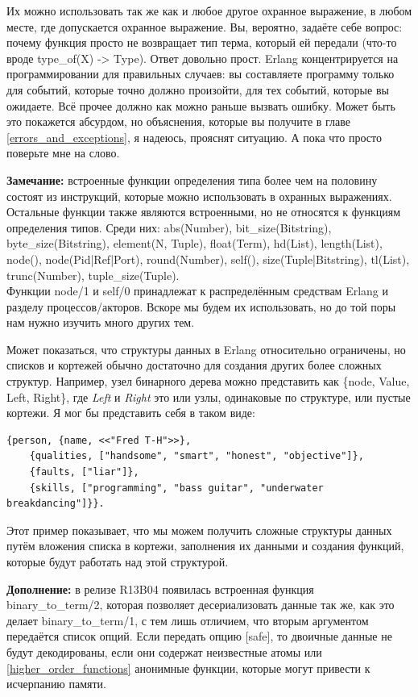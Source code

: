 \documentclass[a4paper,12pt]{report}
\newcommand{\ops}{\colorbox{lgreen}}
\begin{document}
Их можно использовать так же как и любое другое охранное выражение, в любом месте, где допускается охранное выражение. Вы, вероятно, задаёте себе вопрос: почему функция просто не возвращает тип терма, который ей передали (что\--то вроде \ops{type\_of(X) -> Type}). Ответ довольно прост. Erlang концентрируется на программировании для правильных случаев: вы составляете программу только для событий, которые точно должно произойти, для тех событий, которые вы ожидаете. Всё прочее должно как можно раньше вызвать ошибку. Может быть это покажется абсурдом, но объяснения, которые вы получите в главе \ref{errors_and_exceptions}, я надеюсь, прояснят ситуацию. А пока что просто поверьте мне на слово.\\
\colorbox{lgray}
{
    \begin{minipage}{\linewidth}
\textbf{Замечание:} встроенные функции определения типа более чем на половину состоят из инструкций, которые можно использовать в охранных выражениях. Остальные функции также являются встроенными, но не относятся к функциям определения типов. Среди них: \ops{abs(Number), bit\_size(Bitstring), byte\_size(Bitstring),}
\ops{element(N, Tuple), float(Term), hd(List), length(List),}
\ops{node(), node(Pid|Ref|Port), round(Number), self(),}
\ops{size(Tuple|Bitstring), tl(List), trunc(Number), tuple\_size(Tuple).}\\
Функции \ops{node/1} и \ops{self/0} принадлежат к распределённым средствам Erlang и разделу процессов/акторов. Вскоре мы будем их использовать, но до той поры нам нужно изучить много других тем.
    \end{minipage}
}

Может показаться, что структуры данных в Erlang относительно ограничены, но списков и кортежей обычно достаточно для создания других более сложных структур. Например, узел бинарного дерева можно представить как \ops{\{node, Value, Left, Right\}}, где \emph{Left} и \emph{Right} это или узлы, одинаковые по структуре, или пустые кортежи. Я мог бы представить себя в таком виде:
\begin{lstlisting}[style=erlang]
{person, {name, <<"Fred T-H">>},
    {qualities, ["handsome", "smart", "honest", "objective"]},
    {faults, ["liar"]},
    {skills, ["programming", "bass guitar", "underwater breakdancing"]}}.
\end{lstlisting}

Этот пример показывает, что мы можем получить сложные структуры данных путём вложения списка в кортежи, заполнения их данными и создания функций, которые будут работать над этой структурой.\\
\colorbox{lgray}
{
    \begin{minipage}{\linewidth}
\textbf{Дополнение:} в релизе R13B04 появилась встроенная функция \ops{binary\_to\_term/2}, которая позволяет десериализовать данные так же, как это делает \ops{binary\_to\_term/1}, с тем лишь отличием, что вторым аргументом передаётся список опций. Если передать опцию \ops{[safe]}, то двоичные данные не будут декодированы, если они содержат неизвестные атомы или \ref{higher_order_functions} анонимные функции, которые могут привести к исчерпанию памяти.
    \end{minipage}
}
\end{document}
